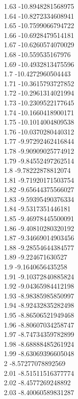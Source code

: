{1.63	-10.8948281568975\\
1.64	-10.8272334608941\\
1.65	-10.7599066794722\\
1.66	-10.6928479514181\\
1.67	-10.6260574070029\\
1.68	-10.559535167976\\
1.69	-10.4932813475596\\
1.7	-10.4272960504443\\
1.71	-10.3615793727852\\
1.72	-10.2961314021994\\
1.73	-10.2309522177645\\
1.74	-10.1660418900171\\
1.75	-10.1014004809538\\
1.76	-10.0370280440312\\
1.77	-9.97292462416844\\
1.78	-9.90909025774912\\
1.79	-9.84552497262514\\
1.8	-9.78222878812074\\
1.81	-9.71920171503754\\
1.82	-9.65644375566027\\
1.83	-9.59395490376334\\
1.84	-9.5317351446181\\
1.85	-9.46978445500091\\
1.86	-9.40810280320192\\
1.87	-9.34669014903456\\
1.88	-9.28554644384577\\
1.89	-9.224671630527\\
1.9	-9.1640656435258\\
1.91	-9.10372840885824\\
1.92	-9.04365984412198\\
1.93	-8.98385985850997\\
1.94	-8.92432835282498\\
1.95	-8.86506521949468\\
1.96	-8.80607034258747\\
1.97	-8.74734359782899\\
1.98	-8.68888485261924\\
1.99	-8.63069396605048\\
2	-8.57277078892569\\
2.01	-8.51511516377774\\
2.02	-8.4577269248892\\
2.03	-8.40060589831287\\
}
